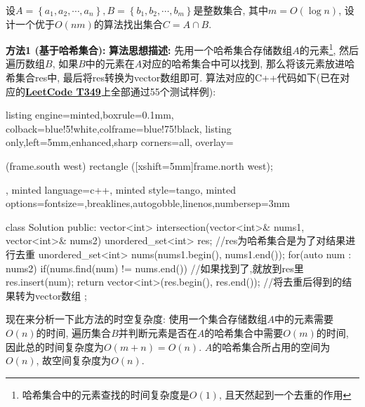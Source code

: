 \documentclass{article}
\begin{document}
\pagebreak

\begin{homeworkProblem}
	设$A=\left\{ a_1,a_2,\cdots ,a_n \right\} ,B=\left\{ b_1,b_2,\cdots ,b_m \right\}$是整数集合, 其中$m=O(\log n)$, 设计一个优于$O(nm)$的算法找出集合$C=A\cap B$.
	

	\solution

	\textbf{方法1 (基于哈希集合):} \textbf{算法思想描述:} 先用一个哈希集合存储数组$A$的元素\footnote{哈希集合中的元素查找的时间复杂度是$O(1)$, 且天然起到一个去重的作用}, 然后遍历数组$B$, 如果$B$中的元素在$A$对应的哈希集合中可以找到, 那么将该元素放进哈希集合res中, 最后将res转换为vector数组即可. 算法对应的C++代码如下(已在对应的\href{https://leetcode.cn/problems/intersection-of-two-arrays/}{\textbf{LeetCode T349}}上全部通过55个测试样例):
\begin{tcblisting}{listing engine=minted,boxrule=0.1mm,
colback=blue!5!white,colframe=blue!75!black,
listing only,left=5mm,enhanced,sharp corners=all,
overlay={\begin{tcbclipinterior} (frame.south west)
rectangle ([xshift=5mm]frame.north west);\end{tcbclipinterior}},
minted language=c++,
minted style=tango,
minted options={fontsize=\small,breaklines,autogobble,linenos,numbersep=3mm}}
class Solution {
public:
    vector<int> intersection(vector<int>& nums1, vector<int>& nums2) {
        unordered_set<int> res;  //res为哈希集合是为了对结果进行去重
        unordered_set<int> nums(nums1.begin(), nums1.end());
        for(auto num : nums2) {
            if(nums.find(num) != nums.end()) {  //如果找到了,就放到res里
                res.insert(num);
            }
        }
        return vector<int>(res.begin(), res.end());  //将去重后得到的结果转为vector数组
    }
};
\end{tcblisting}
	现在来分析一下此方法的时空复杂度: 使用一个集合存储数组$A$中的元素需要$O(n)$的时间, 遍历集合$B$并判断元素是否在$A$的哈希集合中需要$O(m)$的时间, 因此总的时间复杂度为$O(m+n)=O(n)$. $A$的哈希集合所占用的空间为$O(n)$, 故空间复杂度为$O(n)$.


\end{homeworkProblem}
\end{document}
